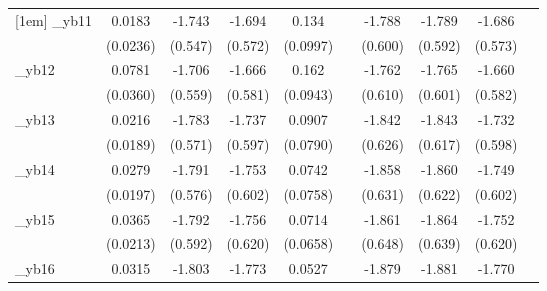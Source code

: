 \begin{table}[htbp]
\begin{tabular}{l*{9}{c}}
[1em]
\_yb11       &      0.0183         &      -1.743\sym{***}&      -1.694\sym{***}&       0.134         &                     &      -1.788\sym{***}&      -1.789\sym{***}&      -1.686\sym{***}&                     \\
            &    (0.0236)         &     (0.547)         &     (0.572)         &    (0.0997)         &                     &     (0.600)         &     (0.592)         &     (0.573)         &                     \\
[1em]
\_yb12       &      0.0781\sym{**} &      -1.706\sym{***}&      -1.666\sym{***}&       0.162\sym{*}  &                     &      -1.762\sym{***}&      -1.765\sym{***}&      -1.660\sym{***}&                     \\
            &    (0.0360)         &     (0.559)         &     (0.581)         &    (0.0943)         &                     &     (0.610)         &     (0.601)         &     (0.582)         &                     \\
[1em]
\_yb13       &      0.0216         &      -1.783\sym{***}&      -1.737\sym{***}&      0.0907         &                     &      -1.842\sym{***}&      -1.843\sym{***}&      -1.732\sym{***}&                     \\
            &    (0.0189)         &     (0.571)         &     (0.597)         &    (0.0790)         &                     &     (0.626)         &     (0.617)         &     (0.598)         &                     \\
[1em]
\_yb14       &      0.0279         &      -1.791\sym{***}&      -1.753\sym{***}&      0.0742         &                     &      -1.858\sym{***}&      -1.860\sym{***}&      -1.749\sym{***}&                     \\
            &    (0.0197)         &     (0.576)         &     (0.602)         &    (0.0758)         &                     &     (0.631)         &     (0.622)         &     (0.602)         &                     \\
[1em]
\_yb15       &      0.0365\sym{*}  &      -1.792\sym{***}&      -1.756\sym{***}&      0.0714         &                     &      -1.861\sym{***}&      -1.864\sym{***}&      -1.752\sym{***}&                     \\
            &    (0.0213)         &     (0.592)         &     (0.620)         &    (0.0658)         &                     &     (0.648)         &     (0.639)         &     (0.620)         &                     \\
[1em]
\_yb16       &      0.0315         &      -1.803\sym{***}&      -1.773\sym{***}&      0.0527         &                     &      -1.879\sym{***}&      -1.881\sym{***}&      -1.770\sym{***}&                     \\

\end{tabular}
\end{table}
